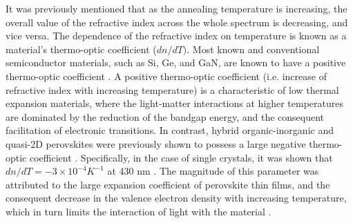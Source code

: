 It was previously mentioned that as the annealing temperature is increasing, the overall value of the refractive index across the whole spectrum is decreasing, and vice versa. The dependence of the refractive index on temperature is known as a material's thermo-optic coefficient ($dn/dT)$.  Most known and conventional semiconductor materials, such as Si, Ge, and GaN, are known to have a positive thermo-optic coefficient \cite{Fujiwara2018SpectroscopicCharacterization, Komma2012Thermo-opticTemperatures, Rao2022Temperature1550nm}. A positive thermo-optic coefficient  (i.e. increase of refractive index with increasing temperature) is a characteristic of low thermal expansion materials, where the light-matter interactions at higher temperatures are dominated by the reduction of the bandgap energy, and the consequent facilitation of electronic transitions. In contrast, hybrid organic-inorganic and quasi-2D perovskites were previously shown to possess a large negative thermo-optic coefficient \cite{Handa2019LargePerovskite, Wu2023CarrierPhononPerovskite}. Specifically, in the case of  single crystals, it was shown that $dn/dT = -3\times 10^{-4} K^{-1}$ at 430 nm \cite{Handa2019LargePerovskite}. The magnitude of this parameter was attributed to the large expansion coefficient of perovskite thin films, and the consequent decrease in the valence electron density with increasing temperature, which in turn limits the interaction of light with the material \cite{Handa2020LargeCH4NH3PbCl3}. 


